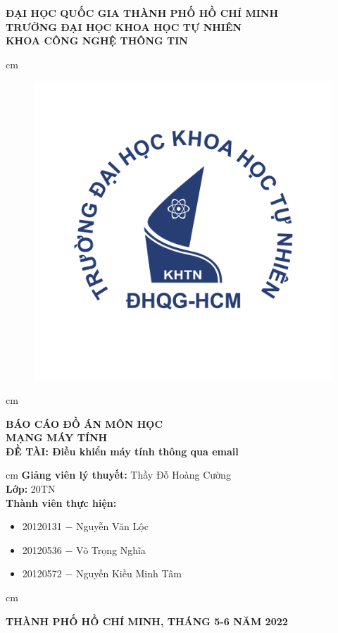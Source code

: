 \begin{titlepage}
\begin{mybox}
\begin{center}
\fontsize{12}{12}\selectfont
\textbf{ĐẠI HỌC QUỐC GIA THÀNH PHỐ HỒ CHÍ MINH}\\
\textbf{TRƯỜNG ĐẠI HỌC KHOA HỌC TỰ NHIÊN}\\
\textbf{KHOA CÔNG NGHỆ THÔNG TIN}
\end{center}
 cm
\begin{figure}[H]
\begin{center}
\includegraphics[scale=0.25]{figures/logo}
\end{center}
\end{figure}
 cm
\begin{center}
\fontsize{18}{14}\selectfont
\textbf{BÁO CÁO ĐỒ ÁN MÔN HỌC}\\
\fontsize{26}{16}\selectfont
\textbf{MẠNG MÁY TÍNH}\\
\fontsize{18}{12}\selectfont
\textbf{ĐỀ TÀI: Điều khiển máy tính thông qua email}
\end{center}
 cm
\fontsize{14}{12}\selectfont
\textbf{Giảng viên lý thuyết:} Thầy Đỗ Hoàng Cường\\
\textbf{Lớp:} 20TN\\
\textbf{Thành viên thực hiện:}
\begin{itemize}
\item 20120131 $-$ Nguyễn Văn Lộc
\item 20120536 $-$ Võ Trọng Nghĩa
\item 20120572 $-$ Nguyễn Kiều Minh Tâm
\end{itemize}
 cm
\begin{center}
\textbf{THÀNH PHỐ HỒ CHÍ MINH, THÁNG 5-6 NĂM 2022}
\end{center}
\end{mybox}
\end{titlepage}